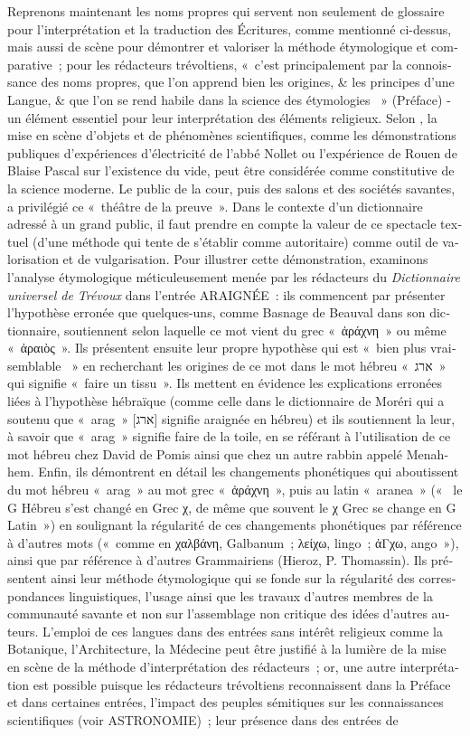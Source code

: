 \documentclass[output=paper,colorlinks,citecolor=brown,arabicfont,chinesefont,booklanguage=french]{langscibook}
\begin{document}
\begin{otherlanguage}{french}
Reprenons maintenant les noms propres qui servent non seulement de glossaire pour l’interprétation et la traduction des Écritures, comme mentionné ci-dessus, mais aussi de scène pour démontrer et valoriser la méthode étymologique et comparative~; pour les rédacteurs trévoltiens, «~c'est principalement par la connoissance des noms propres, que l'on apprend bien les origines, \& les principes d'une Langue, \& que l'on se rend habile dans la science des étymologies ~» (Préface) - un élément essentiel pour leur interprétation des éléments religieux. Selon \citet{Thebaud-sorger2015}, la mise en scène d’objets et de phénomènes scientifiques, comme les démonstrations publiques d’expériences d’électricité de l’abbé Nollet ou l’expérience de Rouen de Blaise Pascal sur l’existence du vide, peut être considérée comme constitutive de la science moderne. Le public de la cour, puis des salons et des sociétés savantes, a privilégié ce «~théâtre de la preuve~». Dans le contexte d’un dictionnaire adressé à un grand public, il faut prendre en compte la valeur de ce spectacle textuel (d’une méthode qui tente de s’établir comme autoritaire) comme outil de valorisation et de vulgarisation. Pour illustrer cette démonstration, examinons l’analyse étymologique méticuleusement menée par les rédacteurs du \emph{Dictionnaire universel de Trévoux} dans l’entrée ARAIGNÉE~: ils commencent par présenter l’hypothèse erronée que quelques-uns, comme Basnage de Beauval dans son dictionnaire, soutiennent selon laquelle ce mot vient du grec «~ἀράχνη~» ou même «~ἀραιὸς~». Ils présentent ensuite leur propre hypothèse qui est «~bien plus vraisemblable ~» en recherchant les origines de ce mot dans le mot hébreu «~ארג~» qui signifie «~faire un tissu~». Ils mettent en évidence les explications erronées liées à l’hypothèse hébraïque (comme celle dans le dictionnaire de Moréri qui a soutenu que «~arag~» [ארג] signifie araignée en hébreu) et ils soutiennent la leur, à savoir que «~arag~» signifie faire de la toile, en se référant à l'utilisation de ce mot hébreu chez David de Pomis ainsi que chez un autre rabbin appelé Menahhem. Enfin, ils démontrent en détail les changements phonétiques qui aboutissent du mot hébreu «~arag~» au mot grec «~ἀράχνη~», puis au latin «~aranea~» («~ le G Hébreu s’est changé en Grec χ, de même que souvent le χ Grec se change en G Latin~») en soulignant la régularité de ces changements phonétiques par référence à d’autres mots («~comme en χαλβάνη, Galbanum~; λείχω, lingo~; ἀΓχω, ango~»), ainsi que par référence à d’autres Grammairiens (Hieroz, P. Thomassin).  Ils présentent ainsi leur méthode étymologique qui se fonde sur la régularité des correspondances linguistiques, l’usage ainsi que les travaux d’autres membres de la communauté savante et non sur l’assemblage non critique des idées d’autres auteurs. L’emploi de ces langues dans des entrées sans intérêt religieux comme la Botanique, l’Architecture, la Médecine peut être justifié à la lumière de la mise en scène de la méthode d’interprétation des rédacteurs~; or, une autre interprétation est possible puisque les rédacteurs trévoltiens reconnaissent dans la Préface et dans certaines entrées, l’impact des peuples sémitiques sur les connaissances scientifiques (voir ASTRONOMIE)~; leur présence dans des entrées de 
\end{otherlanguage}
\end{document}
